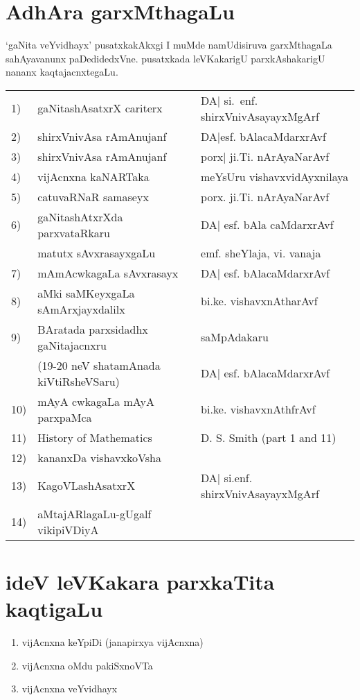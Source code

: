 {\section*{AdhAra garxMthagaLu}

`gaNita veYvidhayx' pusatxkakAkxgi I muMde namUdisiruva garxMthagaLa sahAyavanunx paDedidedxVne. pusatxkada leVKakarigU parxkAshakarigU nananx kaqtajacnxtegaLu.

\begin{longtable}{l>{\raggedright}p{4cm}>{\raggedright}p{4cm}}
{\rm 1)} &  gaNitashAsatxrX cariterx & DA| si.~enf. shirxVnivAsayayxMgArf \tabularnewline
{\rm 2)} & shirxVnivAsa rAmAnujanf & DA|esf. bAlacaMdarxrAvf\tabularnewline
{\rm 3)} & shirxVnivAsa rAmAnujanf & porx| ji.Ti. nArAyaNarAvf\tabularnewline
{\rm 4)} & vijAcnxna kaNARTaka & meYsUru vishavxvidAyxnilaya\tabularnewline
{\rm 5)} & catuvaRNaR samaseyx & porx. ji.Ti. nArAyaNarAvf\tabularnewline
{\rm 6)} & gaNitashAtxrXda parxvataRkaru & DA| esf. bAla caMdarxrAvf\tabularnewline[-0.1cm]
& matutx sAvxrasayxgaLu & emf. sheYlaja, vi. vanaja\tabularnewline
{\rm 7)} & mAmAcwkagaLa sAvxrasayx & DA| esf. bAlacaMdarxrAvf\tabularnewline
{\rm 8)} & aMki saMKeyxgaLa sAmArxjayxdalilx & bi.ke. vishavxnAtharAvf\tabularnewline
{\rm 9)} & BAratada parxsidadhx gaNitajacnxru  & saMpAdakaru \tabularnewline[-0.1cm]
& ({\rm 19-20} neV shatamAnada kiVtiRsheVSaru) & DA| esf. bAlacaMdarxrAvf\tabularnewline
{\rm 10)} & mAyA cwkagaLa mAyA parxpaMca & bi.ke. vishavxnAthfrAvf\tabularnewline
{\rm 11)} & {\rm History of Mathematics} & {\rm D. S. Smith (part 1 and 11)}\tabularnewline[-0.1cm]
{\rm 12)} & kananxDa vishavxkoVsha &\tabularnewline
{\rm 13)} & KagoVLashAsatxrX & DA| si.enf. shirxVnivAsayayxMgArf\tabularnewline
{\rm 14)} & aMtajARlagaLu-gUgalf vikipiVDiyA & \tabularnewline
\end{longtable}

\section*{ideV leVKakara parxkaTita kaqtigaLu}

\begin{enumerate}
\item vijAcnxna keYpiDi (janapirxya vijAcnxna)

\item vijAcnxna oMdu pakiSxnoVTa

\item vijAcnxna veYvidhayx


\end{enumerate}}
